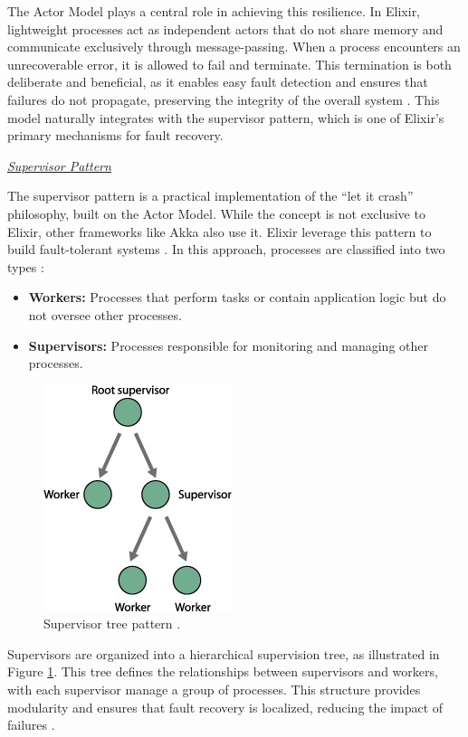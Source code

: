 The Actor Model plays a central role in achieving this resilience. In Elixir, lightweight processes act as independent actors that do not share memory and communicate exclusively through message-passing. When a process encounters an unrecoverable error, it is allowed to fail and terminate. This termination is both deliberate and beneficial, as it enables easy fault detection and ensures that failures do not propagate, preserving the integrity of the overall system \cite{Juric2024,Armstrong2013}. This model naturally integrates with the supervisor pattern, which is one of Elixir’s primary mechanisms for fault recovery.

\textit{\underline{Supervisor Pattern}}

The supervisor pattern is a practical implementation of the “let it crash” philosophy, built on the Actor Model. While the concept is not exclusive to Elixir, other frameworks like Akka also use it. Elixir leverage this pattern to build fault-tolerant systems \cite{Valkov2018}. In this approach, processes are classified into two types \cite{Juric2024}:

\begin{itemize}
    \item \textbf{Workers:} Processes that perform tasks or contain application logic but do not oversee other processes.
    \item \textbf{Supervisors:} Processes responsible for monitoring and managing other processes.
\end{itemize}

\begin{figure}
    \centering
    \includegraphics[scale=0.7]{ch-state/assets/supervisor-design.jpg}
    \caption[Supervisor tree pattern]{Supervisor tree pattern \cite{Juric2024}.}
    \label{fig:supervisor-pattern}
\end{figure}

Supervisors are organized into a hierarchical supervision tree, as illustrated in Figure \ref{fig:supervisor-pattern}. This tree defines the relationships between supervisors and workers, with each supervisor manage a group of processes. This structure provides modularity and ensures that fault recovery is localized, reducing the impact of failures \cite{Armstrong2013}.

